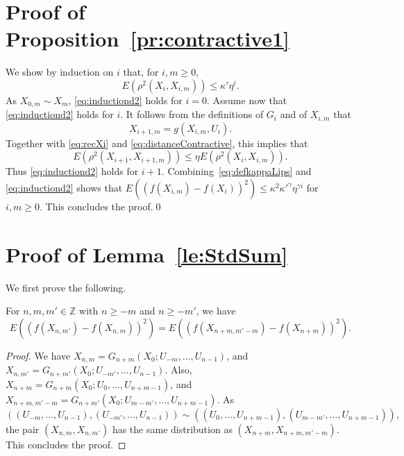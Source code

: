 \documentclass[a4paper,11pt]{article}
\begin{document}
\section{Proof of Proposition~\ref{pr:contractive1}}
We  show by induction on \(i\) that, for \(i,m\geq0\), \begin{equation}
\label{eq:inductiond2}E(\rho^{2}(X_{i},X_{i,m}))\leq\kappa'\eta^{i}.
\end{equation}As \(X_{0,m}\sim X_{m}\), \eqref{eq:inductiond2}  holds for \(i=0\). Assume now that  \eqref{eq:inductiond2} holds for \(i\). It follows from the definitions of \(G_{i}\) and of \(X_{i,m}\) that\begin{equation*}
X_{i+1,m}=g(X_{i,m},U_{i}).
\end{equation*}
Together with \eqref{eq:recXi} and \eqref{eq:distanceContractive}, this implies that\begin{equation*}
E(\rho^{2}(X_{i+1},X_{i+1,m}))\leq\eta E(\rho^{2}(X_{i},X_{i,m})).
\end{equation*}
Thus  \eqref{eq:inductiond2} holds for \(i+1\). Combining~\eqref{eq:defkappaLips} and \eqref{eq:inductiond2} shows that \(E((f(X_{i,m})-f(X_{i}))^{2})\leq\kappa^{2}\kappa'^{\gamma}\eta^{\gamma i}\) for \(i,m\geq0\). This concludes the proof.\qed
\section{Proof of Lemma~\ref{le:StdSum}}
We first prove the following.\begin{proposition}
\label{pr:shiftedPair}For  \(n,m,m'\in\mathbb{Z}\) with \(n\geq-m\) and \( n\geq -m'\), we have\begin{displaymath}
E((f(X_{n,m'})-f(X_{n,m}))^{2})=E((f(X_{n+m,m'-m})-f(X_{n+m}))^{2}).
\end{displaymath} \end{proposition}
\begin{proof}
 We have \(X_{n,m}=G_{n+m}(X_{0};U_{-m},\dots,U_{n-1})\), and  \(X_{n,m'}=G_{n+m'}(X_{0};U_{-m'},\dots,U_{n-1})\). Also,  \(X_{n+m}=G_{n+m}(X_{0};U_{0},\dots,U_{n+m-1})\), and \(X_{n+m,m'-m}=G_{n+m'}(X_{0};U_{m-m'},\dots,U_{n+m-1})\). As\begin{displaymath}
((U_{-m},\dots,U_{n-1}),(U_{-m'},\dots,U_{n-1}))\sim((U_{0},\dots,U_{n+m-1}),(U_{m-m'},\dots,U_{n+m-1})),  \end{displaymath} the pair \((X_{n,m},X_{n,m'})\) has the same distribution as  \((X_{n+m},X_{n+m,m'-m})\).
This concludes the proof.\end{proof}
\end{document}
